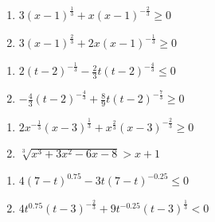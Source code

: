 \documentclass{ximera}
\begin{document}
\begin{multicols}{2}
\begin{enumerate}
\setcounter{enumi}{\value{HW}}


\item  $3(x-1)^{\frac{1}{3}} +x (x-1)^{-\frac{2}{3}} \geq 0$ %

\item $3(x-1)^{\frac{2}{3}} +2x (x-1)^{-\frac{1}{3}} \geq 0$ %

\setcounter{HW}{\value{enumi}}
\end{enumerate}
\end{multicols}


\begin{multicols}{2}
\begin{enumerate}
\setcounter{enumi}{\value{HW}}


\item  $2 (t-2)^{-\frac{1}{3}} -\frac{2}{3} t(t-2)^{-\frac{4}{3}} \leq 0$ 
\item  $-\frac{4}{3} (t-2)^{-\frac{4}{3}} + \frac{8}{9} t (t-2)^{-\frac{7}{3}} \geq 0$

\setcounter{HW}{\value{enumi}}
\end{enumerate}
\end{multicols}

\begin{multicols}{2}
\begin{enumerate}
\setcounter{enumi}{\value{HW}}


\item  $2x^{-\frac{1}{3}}(x-3)^{\frac{1}{3}} + x^{\frac{2}{3}} (x-3)^{-\frac{2}{3}} \geq 0$
\item $\sqrt[3]{x^{3} + 3x^{2} - 6x - 8} > x + 1$ 


\setcounter{HW}{\value{enumi}}
\end{enumerate}
\end{multicols}

\begin{multicols}{2}
\begin{enumerate}
\setcounter{enumi}{\value{HW}}

\item $4(7-t)^{0.75} - 3t(7-t)^{-0.25} \leq 0$   %

\item $4t^{0.75}(t - 3)^{-\frac{2}{3}} +9t^{-0.25}(t - 3)^{\frac{1}{3}} < 0$

\setcounter{HW}{\value{enumi}}
\end{enumerate}
\end{multicols}
\end{document}
